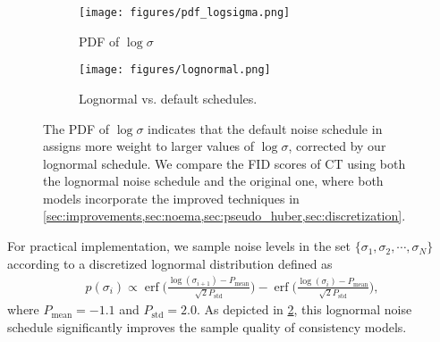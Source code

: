 \begin{figure}
    \centering
    \begin{subfigure}[b]{0.345\textwidth}
        \centering
        \texttt{[image: figures/pdf\_logsigma.png]}
        \caption{PDF of $\log \sigma$}\label{fig:pdf_logsigma}
    \end{subfigure}
    \begin{subfigure}[b]{0.33\textwidth}
        \centering
        \texttt{[image: figures/lognormal.png]}
        \caption{Lognormal vs. default schedules.}\label{fig:lognormal}
    \end{subfigure}
    \caption{The PDF of $\log \sigma$ indicates that the default noise schedule in \citet{song2023consistency} assigns more weight to larger values of $\log \sigma$, corrected by our lognormal schedule. We compare the FID scores of CT using both the lognormal noise schedule and the original one, where both models incorporate the improved techniques in \cref{sec:improvements,sec:noema,sec:pseudo_huber,sec:discretization}.}\label{fig:lognormal_schedule}
\end{figure}

For practical implementation, we sample noise levels in the set $\{\sigma_1, \sigma_2, \cdots, \sigma_N\}$ according to a discretized lognormal distribution defined as
\begin{align}
p(\sigma_i) \propto \operatorname{erf}\bigg(\frac{\log(\sigma_{i+1}) - P_\text{mean}}{\sqrt{2}P_\text{std}}\bigg) - \operatorname{erf}\bigg(\frac{\log(\sigma_{i}) - P_\text{mean}}{\sqrt{2}P_\text{std}}\bigg),
\end{align}
where $P_\text{mean} = -1.1$ and $P_\text{std} = 2.0$. As depicted in \cref{fig:lognormal}, this lognormal noise schedule significantly improves the sample quality of consistency models.

